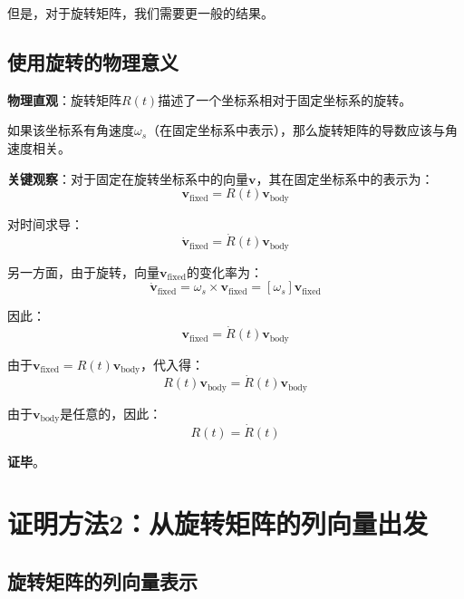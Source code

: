 \documentclass[12pt,a4paper]{article}
\begin{document}
但是，对于旋转矩阵，我们需要更一般的结果。

\subsection{使用旋转的物理意义}

\textbf{物理直观}：旋转矩阵$R(t)$描述了一个坐标系相对于固定坐标系的旋转。

如果该坐标系有角速度$\omega_s$（在固定坐标系中表示），那么旋转矩阵的导数应该与角速度相关。

\textbf{关键观察}：对于固定在旋转坐标系中的向量$\mathbf{v}$，其在固定坐标系中的表示为：
\begin{equation}
\mathbf{v}_{\text{fixed}} = R(t) \mathbf{v}_{\text{body}}
\end{equation}

对时间求导：
\begin{equation}
\dot{\mathbf{v}}_{\text{fixed}} = \dot{R}(t) \mathbf{v}_{\text{body}}
\end{equation}

另一方面，由于旋转，向量$\mathbf{v}_{\text{fixed}}$的变化率为：
\begin{equation}
\dot{\mathbf{v}}_{\text{fixed}} = \omega_s \times \mathbf{v}_{\text{fixed}} = [\omega_s] \mathbf{v}_{\text{fixed}}
\end{equation}

因此：
\begin{equation}
[\omega_s] \mathbf{v}_{\text{fixed}} = \dot{R}(t) \mathbf{v}_{\text{body}}
\end{equation}

由于$\mathbf{v}_{\text{fixed}} = R(t) \mathbf{v}_{\text{body}}$，代入得：
\begin{equation}
[\omega_s] R(t) \mathbf{v}_{\text{body}} = \dot{R}(t) \mathbf{v}_{\text{body}}
\end{equation}

由于$\mathbf{v}_{\text{body}}$是任意的，因此：
\begin{equation}
[\omega_s] R(t) = \dot{R}(t)
\end{equation}

\textbf{证毕}。

\section{证明方法2：从旋转矩阵的列向量出发}

\subsection{旋转矩阵的列向量表示}
\end{document}
